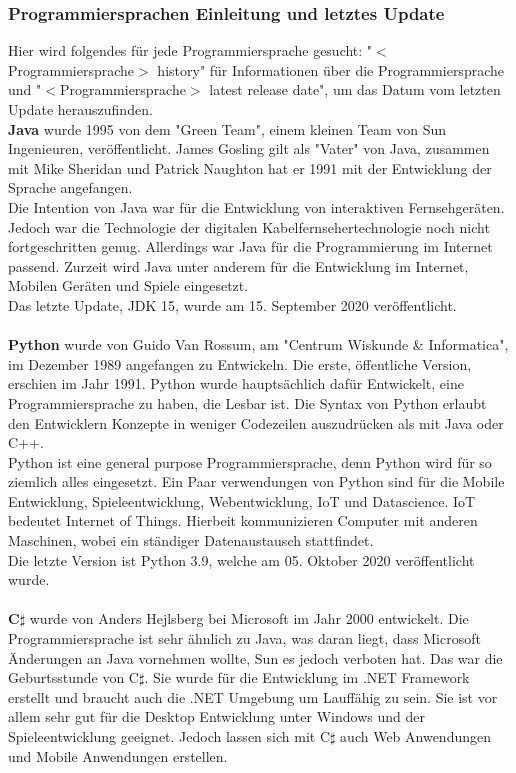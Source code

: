 \documentclass[ngerman]{article}
\begin{document}
    \subsubsection{Programmiersprachen Einleitung und letztes Update}
    \label{Grundlagen Zukunftssicherheit}
    Hier wird folgendes für jede Programmiersprache gesucht: "$<$Programmiersprache$>$ history" für Informationen über die Programmiersprache und "$<$Programmiersprache$>$ latest release date", um das Datum vom letzten Update herauszufinden.\\
    \textbf{Java} wurde 1995 von dem "Green Team", einem kleinen Team von Sun Ingenieuren, veröffentlicht. James Gosling gilt als "Vater" von Java, zusammen mit Mike Sheridan und Patrick Naughton hat er 1991 mit der Entwicklung der Sprache angefangen.\\
    Die Intention von Java war für die Entwicklung von interaktiven Fernsehgeräten. Jedoch war die Technologie der digitalen Kabelfernsehertechnologie noch nicht fortgeschritten genug. Allerdings war Java für die Programmierung im Internet passend. Zurzeit wird Java unter anderem für die Entwicklung im Internet, Mobilen Geräten und Spiele eingesetzt. \cite{JavaHistory}\\
    Das letzte Update, JDK 15, wurde am 15. September 2020 veröffentlicht. \cite{JavaLatestRelease}\\\\
    \textbf{Python} wurde von Guido Van Rossum, am "Centrum Wiskunde \& Informatica", im Dezember 1989 angefangen zu Entwickeln. Die erste, öffentliche Version, erschien im Jahr 1991. Python wurde hauptsächlich dafür Entwickelt, eine Programmiersprache zu haben, die Lesbar ist. Die Syntax von Python erlaubt den Entwicklern Konzepte in weniger Codezeilen auszudrücken als mit Java oder C++. \cite{PythonHistory1}\\
    Python ist eine general purpose Programmiersprache, denn Python wird für so ziemlich alles eingesetzt. Ein Paar verwendungen von Python sind für die Mobile Entwicklung, Spieleentwicklung, Webentwicklung, IoT und Datascience. \cite{PythonHistory2} IoT bedeutet Internet of Things. Hierbeit kommunizieren Computer mit anderen Maschinen, wobei ein ständiger Datenaustausch stattfindet.\\
    Die letzte Version ist Python 3.9, welche am 05. Oktober 2020 veröffentlicht wurde. \cite{PythonLatestRelease}\\\\
    \textbf{C$\sharp$} wurde von Anders Hejlsberg bei Microsoft im Jahr 2000 entwickelt. Die Programmiersprache ist sehr ähnlich zu Java, was daran liegt, dass Microsoft Änderungen an Java vornehmen wollte, Sun es jedoch verboten hat. Das war die Geburtsstunde von C$\sharp$. Sie wurde für die Entwicklung im .NET Framework erstellt und braucht auch die .NET Umgebung um Lauffähig zu sein. Sie ist vor allem sehr gut für die Desktop Entwicklung unter Windows und der Spieleentwicklung geeignet. Jedoch lassen sich mit C$\sharp$ auch Web Anwendungen und Mobile Anwendungen erstellen. \cite{CSharpHistory}\\
\end{document}
